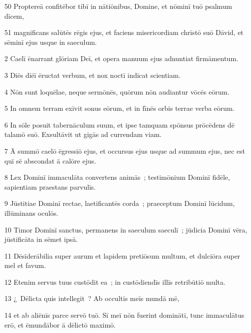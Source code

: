 \psalmVerse
  {\phantom{0}50}
  {Proptereā confitēbor tibī in nātiōnibus, Domine, et nōminī tuō psalmum dīcem,}


\psalmVerse
  {\phantom{0}51}
  {magnificans salūtēs rēgis ejus, et faciens misericordiam chrīstō suō Dāvid, et sēminī ejus usque in saeculum.}




\psalmVerse
  {\phantom{00}2}
  {Caelī ēnarrant glōriam Deī, et opera manuum ejus adnuntiat firmāmentum.}


\psalmVerse
  {\phantom{00}3}
  {Diēs diēī ēructat verbum, et nox noctī indicat scientiam.}


\psalmVerse
  {\phantom{00}4}
  {Nōn sunt loquēlae, neque sermōnēs, quōrum nōn audiantur vōcēs eōrum.}


\psalmVerse
  {\phantom{00}5}
  {In omnem terram exīvit sonus eōrum, et in fīnēs orbis terrae verba eōrum.}


\psalmVerse
  {\phantom{00}6}
  {In sōle posuit tabernāculum suum, et ipse tamquam spōnsus prōcēdens dē talamō suō. Exsultāvit ut gigās ad currendam viam.}


\psalmVerse
  {\phantom{00}7}
  {Ā summō caelō ēgressiō ejus, et occursus ejus usque ad summum ejus, nec est quī sē abscondat ā calōre ejus.}


\psalmVerse
  {\phantom{00}8}
  {Lex Dominī immaculāta convertens animās~; testimōnium Dominī fidēle, sapientiam praestans parvulīs.}


\psalmVerse
  {\phantom{00}9}
  {Jūstitiae Dominī rectae, laetificantēs corda~; praeceptum Dominī lūcidum, illūminans oculōs.}


\psalmVerse
  {\phantom{0}10}
  {Timor Dominī sanctus, permanens in saeculum saeculī~; jūdicia Dominī vēra, jūstificāta in sēmet ipsā.}


\psalmVerse
  {\phantom{0}11}
  {Dēsīderābilia super aurum et lapidem pretiōsum multum, et dulciōra super mel et favum.}


\psalmVerse
  {\phantom{0}12}
  {Etenim servus tuus custōdit ea~; in custōdiendīs illīs retribūtiō multa.}


\psalmVerse
  {\phantom{0}13}
  {¿~Dēlicta quis intellegit~? Ab occultīs meīs mundā mē,}


\psalmVerse
  {\phantom{0}14}
  {et ab aliēnīs parce servō tuō. Sī meī nōn fuerint dominātī, tunc immaculātus erō, et ēmundābor ā dēlictō maximō.}


